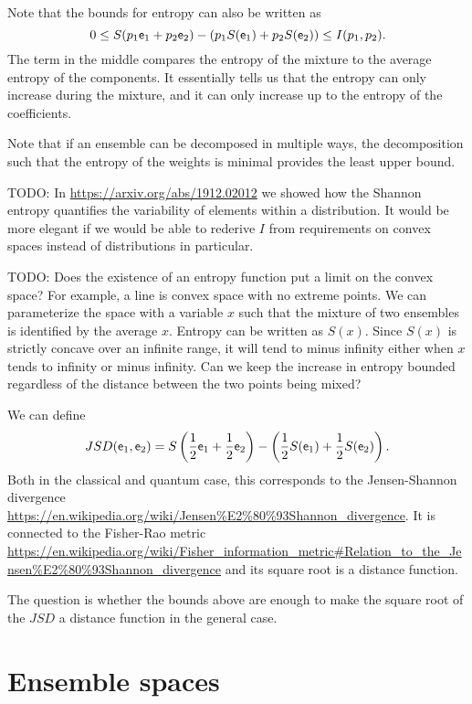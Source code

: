 \begin{remark}
	Note that the bounds for entropy can also be written as
	$$ 0 \leq S(p_1\mathsf{e}_1 + p_2 \mathsf{e}_2) - (p_1 S(\mathsf{e}_1) + p_2 S(\mathsf{e}_2)) \leq I(p_1, p_2).$$
	The term in the middle compares the entropy of the mixture to the average entropy of the components. It essentially tells us that the entropy can only increase during the mixture, and it can only increase up to the entropy of the coefficients.
	
	Note that if an ensemble can be decomposed in multiple ways, the decomposition such that the entropy of the weights is minimal provides the least upper bound.
	
	TODO: In \url{https://arxiv.org/abs/1912.02012} we showed how the Shannon entropy quantifies the variability of elements within a distribution. It would be more elegant if we would be able to rederive $I$ from requirements on convex spaces instead of distributions in particular.
	
	TODO: Does the existence of an entropy function put a limit on the convex space? For example, a line is convex space with no extreme points. We can parameterize the space with a variable $x$ such that the mixture of two ensembles is identified by the average $x$. Entropy can be written as $S(x)$. Since $S(x)$ is strictly concave over an infinite range, it will tend to minus infinity either when $x$ tends to infinity or minus infinity. Can we keep the increase in entropy bounded regardless of the distance between the two points being mixed? 
\end{remark}

\begin{remark}
	We can define
	$$JSD(\mathsf{e}_1, \mathsf{e}_2) = S\left(\frac{1}{2}\mathsf{e}_1 + \frac{1}{2} \mathsf{e}_2\right) - \left(\frac{1}{2} S(\mathsf{e}_1) + \frac{1}{2} S(\mathsf{e}_2)\right).$$
	Both in the classical and quantum case, this corresponds to the Jensen-Shannon divergence \url{https://en.wikipedia.org/wiki/Jensen%E2%80%93Shannon_divergence}. It is connected to the Fisher-Rao metric \url{https://en.wikipedia.org/wiki/Fisher_information_metric#Relation_to_the_Jensen%E2%80%93Shannon_divergence} and its square root is a distance function.
	
	The question is whether the bounds above are enough to make the square root of the $JSD$ a distance function in the general case.
\end{remark}

\section{Ensemble spaces}

